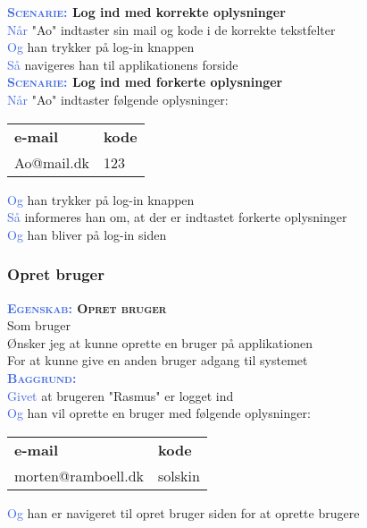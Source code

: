 \textbf{\textsc{\textcolor{RoyalBlue}{Scenarie:}} Log ind med korrekte oplysninger}\\
\textcolor{RoyalBlue}{Når} "Ao" indtaster sin mail og kode i de korrekte tekstfelter\\
\textcolor{RoyalBlue}{Og} han trykker på log-in knappen\\
\textcolor{RoyalBlue}{Så} navigeres han til applikationens forside\\

\textbf{\textsc{\textcolor{RoyalBlue}{Scenarie:}} Log ind med forkerte oplysninger} \\
\textcolor{RoyalBlue}{Når} "Ao" indtaster følgende oplysninger:\\
\begin{tabular}{| l | l |}
	\textbf{e-mail} & \textbf{kode}\\
	Ao@mail.dk & 123\\
\end{tabular}
\newline \newline
\textcolor{RoyalBlue}{Og} han trykker på log-in knappen\\
\textcolor{RoyalBlue}{Så} informeres han om, at der er indtastet forkerte oplysninger\\
\textcolor{RoyalBlue}{Og} han bliver på log-in siden\\

\clearpage

\subsubsection{Opret bruger} \label{sec:USOpretBruger}
\textbf{\textsc{\textcolor{RoyalBlue}{Egenskab:} Opret bruger}} \\
Som bruger\\
Ønsker jeg at kunne oprette en bruger på applikationen\\
For at kunne give en anden bruger adgang til systemet\\

\textcolor{RoyalBlue}{\textbf{\textsc{Baggrund:}}}\\
\textcolor{RoyalBlue}{Givet} at brugeren "Rasmus" er logget ind \\
\textcolor{RoyalBlue}{Og} han vil oprette en bruger med følgende oplysninger:\\
\begin{tabular}{| l | l |}
	\textbf{e-mail} & \textbf{kode} \\
	morten@ramboell.dk & solskin\\
\end{tabular}
\newline \newline
\textcolor{RoyalBlue}{Og} han er navigeret til opret bruger siden for at oprette brugere\\

